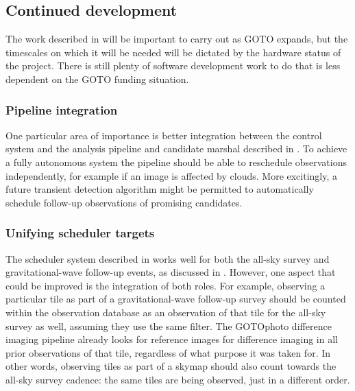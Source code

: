 \subsection{Continued development}
\label{sec:software_future}
\begin{colsection}

The work described in  will be important to carry out as GOTO expands, but the timescales on which it will be needed will be dictated by the hardware status of the project. There is still plenty of software development work to do that is less dependent on the GOTO funding situation.

\subsubsection{Pipeline integration}

One particular area of importance is better integration between the control system and the analysis pipeline and candidate marshal described in . To achieve a fully autonomous system the pipeline should be able to reschedule observations independently, for example if an image is affected by clouds. More excitingly, a future transient detection algorithm might be permitted to automatically schedule follow-up observations of promising candidates.

\subsubsection{Unifying scheduler targets}

The scheduler system described in  works well for both the all-sky survey and gravitational-wave follow-up events, as discussed in . However, one aspect that could be improved is the integration of both roles. For example, observing a particular tile as part of a gravitational-wave follow-up survey should be counted within the observation database as an observation of that tile for the all-sky survey as well, assuming they use the same filter. The GOTOphoto difference imaging pipeline already looks for reference images for difference imaging in all prior observations of that tile, regardless of what purpose it was taken for. In other words, observing tiles as part of a skymap should also count towards the all-sky survey cadence: the same tiles are being observed, just in a different order.

\newpage


\end{colsection}
